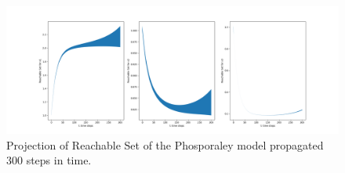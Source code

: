 \begin{example}
\begin{figure}
\label{fig:kaa_phos}
  \hspace*{-2.3cm}
  \includegraphics[width=1.3\textwidth]{figures/PhosporlayProjOn X_1, X_2, X_3.png}
  \caption{Projection of Reachable Set of the Phosporaley model propagated 300 steps in time.}
\end{figure}
\end{example}
